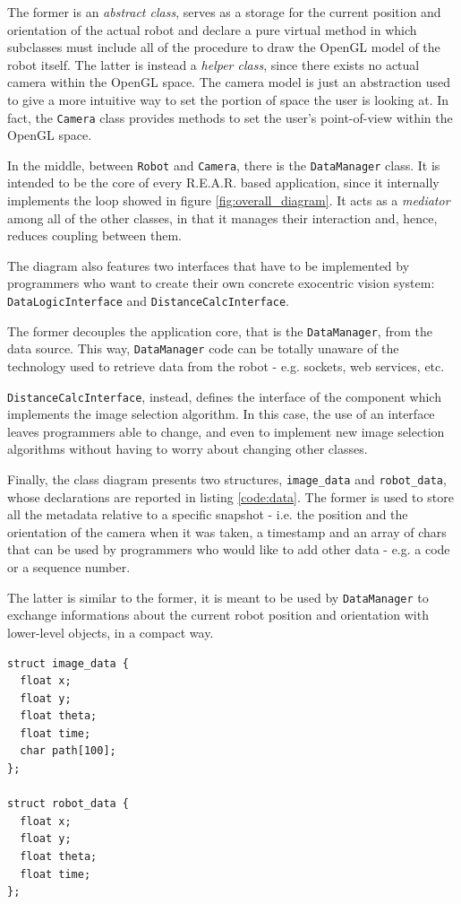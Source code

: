 %
The former is an \textit{abstract class}, serves as a storage 
for the current position and orientation of the actual
robot and declare a pure virtual method in which subclasses 
must include all of the procedure to draw the OpenGL model 
of the robot itself.
%
The latter is instead a \textit{helper class}, since there 
exists no actual camera within the OpenGL space. The camera 
model is just an abstraction used to give a more intuitive
way to set the portion of space the user is looking at.
In fact, the \texttt{Camera} class provides methods to 
set the user's point-of-view within the OpenGL space.
%

%
In the middle, between \texttt{Robot} and \texttt{Camera},
there is the \texttt{DataManager} class. It is intended to be 
the core of every \textsf{R.E.A.R.} based application, since it 
internally implements the loop showed in figure 
\ref{fig:overall_diagram}.
It acts as a \textit{mediator} among all of the other classes, 
in that it manages their interaction and, hence, reduces 
coupling between them.
%

%
The diagram also features two interfaces that have to be implemented 
by programmers who want to create their own concrete exocentric 
vision system: \texttt{DataLogicInterface} and 
\texttt{DistanceCalcInterface}.
%

%
The former decouples the application 
core, that is the \texttt{DataManager}, from the data source.
This way, \texttt{DataManager} code can be totally unaware of 
the technology used to retrieve data from the robot - e.g. 
sockets, web services, etc.
%

%
\texttt{DistanceCalcInterface}, instead, defines the interface 
of the component which implements the image selection algorithm.
%
In this case, the use of an interface leaves programmers 
able to change, and even to implement new image 
selection algorithms without having to worry about
changing other classes.
%

%
Finally, the class diagram presents two structures, 
\texttt{image\_data} and \texttt{robot\_data}, whose 
declarations are reported in listing \ref{code:data}.
%
The former is used to store all the metadata 
relative to a specific snapshot - i.e. the position 
and the orientation of the camera when it was taken, 
a timestamp and an array of chars that can be used by 
programmers who would like to add other data - e.g. 
a code or a sequence number.
%

%
The latter is similar to the former, it is meant to be 
used by \texttt{DataManager} to exchange informations
about the current robot position and orientation with 
lower-level objects, in a compact way.
%
\begin{lstlisting}[caption={\textsf{R.E.A.R.} data structures}, label={code:data}, frame=trBL]
struct image_data {
  float x;
  float y;
  float theta;
  float time;
  char path[100];
};

struct robot_data {
  float x;
  float y;
  float theta;
  float time;
};
\end{lstlisting}
%

